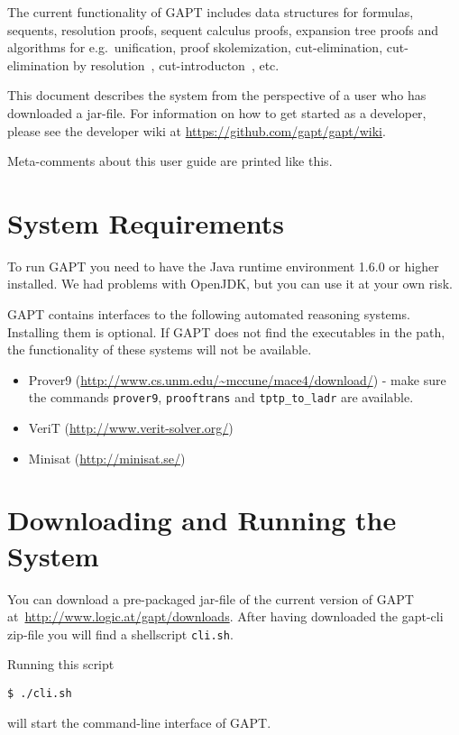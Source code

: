 \documentclass[a4paper,11pt]{article}
\begin{document}
The current functionality of GAPT includes data structures for formulas,
sequents, resolution proofs, sequent calculus proofs, expansion tree proofs
and algorithms for e.g.\ unification, proof skolemization, cut-elimination,
cut-elimination by resolution~\cite{Baaz00CutElimination}, cut-introducton~\cite{Hetzl2012}, etc.

This document describes the system from the perspective of a user who has
downloaded a jar-file. For information on how to get started as a developer,
please see the developer wiki at \url{https://github.com/gapt/gapt/wiki}.

\begin{meta}
Meta-comments about this user guide are printed like this.
\end{meta}

\section{System Requirements}
\label{sec:sysreq}

To run GAPT you need to have the Java runtime environment 1.6.0 or higher installed. We had
problems with OpenJDK, but you can use it at your own risk.

GAPT contains interfaces to the following automated reasoning systems. Installing
them is optional. If GAPT does not find the executables in the path, the
functionality of these systems will not be available. 
%
\begin{itemize}
\item Prover9 (\url{http://www.cs.unm.edu/~mccune/mace4/download/}) - make sure
the commands \texttt{prover9}, \texttt{prooftrans} and \texttt{tptp\_to\_ladr}
are available.
\item VeriT (\url{http://www.verit-solver.org/})
\item Minisat (\url{http://minisat.se/})
\end{itemize}

\section{Downloading and Running the System}

You can download a pre-packaged jar-file of the current version of GAPT
at~\url{http://www.logic.at/gapt/downloads}. After having downloaded
the gapt-cli zip-file you will find a shellscript \texttt{cli.sh}.

Running this script
\begin{lstlisting}[mathescape=false]
$ ./cli.sh
\end{lstlisting}
will start the command-line interface of GAPT.
\end{document}
